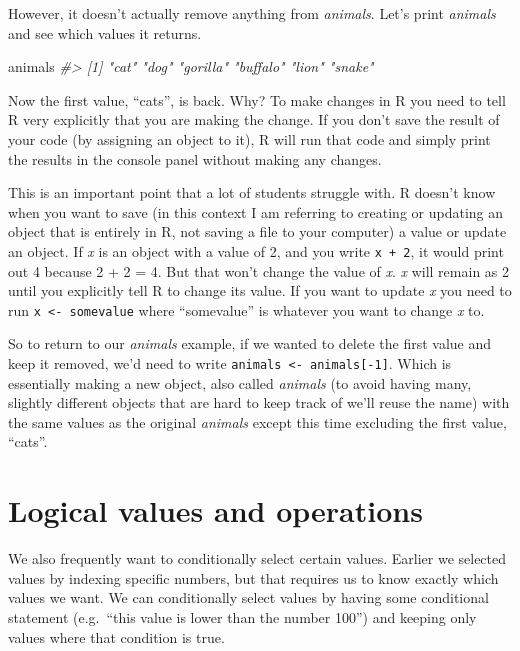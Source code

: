 \documentclass[
]{krantz}
\makeatletter
\newenvironment{Shaded}{\begin{snugshade}}{\end{snugshade}}
\newcommand{\CommentTok}[1]{\textcolor[rgb]{0.37,0.37,0.37}{\textit{#1}}}
\newcommand{\NormalTok}[1]{#1}
\newenvironment{kframe}{%
\medskip{}
\setlength{\fboxsep}{.8em}
 \def\at@end@of@kframe{}%
 \ifinner\ifhmode%
  \def\at@end@of@kframe{\end{minipage}}%
  \begin{minipage}{\columnwidth}%
 \fi\fi%
 \def\FrameCommand##1{\hskip\@totalleftmargin \hskip-\fboxsep
 \colorbox{shadecolor}{##1}\hskip-\fboxsep
     \hskip-\linewidth \hskip-\@totalleftmargin \hskip\columnwidth}%
 \MakeFramed {\advance\hsize-\width
   \@totalleftmargin\z@ \linewidth\hsize
   \@setminipage}}%
 {\par\unskip\endMakeFramed%
 \at@end@of@kframe}
\renewenvironment{Shaded}{\begin{kframe}}{\end{kframe}}
\makeatother
\begin{document}
However, it doesn't actually remove anything from \emph{animals}. Let's print \emph{animals} and see which values it returns.

\begin{Shaded}
\begin{Highlighting}[]
\NormalTok{animals}
\CommentTok{\#\textgreater{} [1] "cat"     "dog"     "gorilla" "buffalo" "lion"    "snake"}
\end{Highlighting}
\end{Shaded}

Now the first value, ``cats'', is back. Why? To make changes in R you need to tell R very explicitly that you are making the change. If you don't save the result of your code (by assigning an object to it), R will run that code and simply print the results in the console panel without making any changes.

This is an important point that a lot of students struggle with. R doesn't know when you want to save (in this context I am referring to creating or updating an object that is entirely in R, not saving a file to your computer) a value or update an object. If \emph{x} is an object with a value of 2, and you write \texttt{x\ +\ 2}, it would print out 4 because 2 + 2 = 4. But that won't change the value of \emph{x}. \emph{x} will remain as 2 until you explicitly tell R to change its value. If you want to update \emph{x} you need to run \texttt{x\ \textless{}-\ somevalue} where ``somevalue'' is whatever you want to change \emph{x} to.

So to return to our \emph{animals} example, if we wanted to delete the first value and keep it removed, we'd need to write \texttt{animals\ \textless{}-\ animals{[}-1{]}}. Which is essentially making a new object, also called \emph{animals} (to avoid having many, slightly different objects that are hard to keep track of we'll reuse the name) with the same values as the original \emph{animals} except this time excluding the first value, ``cats''.

\hypertarget{logical-values-and-operations}{%
\section{Logical values and operations}\label{logical-values-and-operations}}

We also frequently want to conditionally select certain values. Earlier we selected values by indexing specific numbers, but that requires us to know exactly which values we want. We can conditionally select values by having some conditional statement (e.g.~``this value is lower than the number 100'') and keeping only values where that condition is true.
\end{document}
